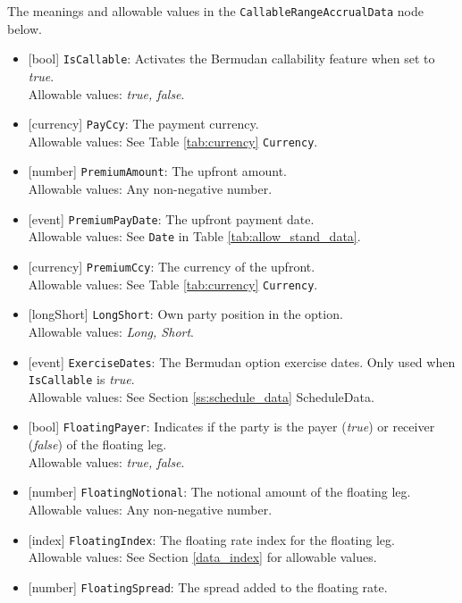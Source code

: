 The meanings and allowable values in the \lstinline!CallableRangeAccrualData! node below.

\begin{itemize}
  \item{}[bool] \lstinline!IsCallable!: Activates the Bermudan callability feature when set to \emph{true}. \\
  Allowable values: \emph{true, false}.
  \item{}[currency] \lstinline!PayCcy!: The payment currency. \\
  Allowable values: See Table \ref{tab:currency} \lstinline!Currency!.
  \item{}[number] \lstinline!PremiumAmount!: The upfront amount. \\
  Allowable values: Any non-negative number.
  \item{}[event] \lstinline!PremiumPayDate!: The upfront payment date. \\
  Allowable values: See \lstinline!Date! in Table \ref{tab:allow_stand_data}.
  \item{}[currency] \lstinline!PremiumCcy!: The currency of the upfront. \\
  Allowable values: See Table \ref{tab:currency} \lstinline!Currency!.
  \item{}[longShort] \lstinline!LongShort!: Own party position in the option. \\
  Allowable values: \emph{Long, Short}.
  \item{}[event] \lstinline!ExerciseDates!: The Bermudan option exercise dates. Only used when \lstinline!IsCallable! is \emph{true}. \\
  Allowable values: See Section \ref{ss:schedule_data} ScheduleData.
  \item{}[bool] \lstinline!FloatingPayer!: Indicates if the party is the payer (\emph{true}) or receiver (\emph{false}) of the floating leg. \\
  Allowable values: \emph{true, false}.
  \item{}[number] \lstinline!FloatingNotional!: The notional amount of the floating leg. \\
  Allowable values: Any non-negative number.
  \item{}[index] \lstinline!FloatingIndex!: The floating rate index for the floating leg. \\
  Allowable values: See Section \ref{data_index} for allowable values.
  \item{}[number] \lstinline!FloatingSpread!: The spread added to the floating rate. \\

\end{itemize}
